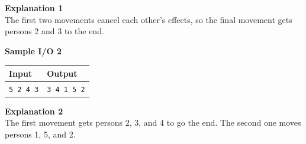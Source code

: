 \documentclass{article}
\begin{document}
{\noindent \bf Explanation 1}\\
The first two movements cancel each other's effects, so the final movement gets persons 2 and 3 to the end. \newline

{\noindent \bf Sample I/O 2}\\
\begin{tabular}{|p{}|p{}|}
    \hline
    \textbf{Input} & \textbf{Output}\\
    \hline
    \texttt{5 2 \newline 2 4 \newline 1 3}
    &
    \texttt{3 4 1 5 2}\\
    \hline
\end{tabular} \newline \newline

{\noindent \bf Explanation 2}\\
The first movement gets persons 2, 3, and 4 to go the end. The second one moves persons 1, 5, and 2.
\end{document}
